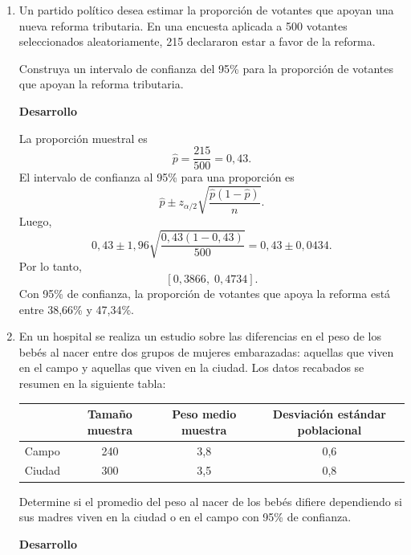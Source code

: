 \documentclass[letterpaper,11pt]{article}
\begin{document}
\begin{enumerate}
Construya un intervalo de confianza del 95\% para el tiempo promedio diario que los usuarios pasan en la aplicación.

\textbf{Desarrollo}

Como la desviación estándar poblacional es conocida, usamos
\[
\bar{x}\pm z_{\alpha/2}\frac{\sigma}{\sqrt{n}}.
\]
Con $\bar{x}=42$, $\sigma=12$, $n=150$ y $z_{0,025}=1,96$:
\[
42\pm 1,96\frac{12}{\sqrt{150}}
=42\pm 1,92.
\]
Así, el intervalo de confianza al 95\% es
\[
\boxed{[40,08,\;43,92].}
\]
Con 95\% de confianza, el tiempo promedio diario se encuentra entre 40,08 y 43,92 minutos.

\item Un partido político desea estimar la proporción de votantes que apoyan una nueva reforma tributaria. En una encuesta aplicada a 500 votantes seleccionados aleatoriamente, 215 declararon estar a favor de la reforma.

Construya un intervalo de confianza del 95\% para la proporción de votantes que apoyan la reforma tributaria.

\textbf{Desarrollo}

La proporción muestral es
\[
\hat{p}=\frac{215}{500}=0,43.
\]
El intervalo de confianza al 95\% para una proporción es
\[
\hat{p}\pm z_{\alpha/2}\sqrt{\frac{\hat{p}(1-\hat{p})}{n}}.
\]
Luego,
\[
0,43\pm 1,96\sqrt{\frac{0,43(1-0,43)}{500}}
=0,43\pm 0,0434.
\]
Por lo tanto,
\[
\boxed{[0,3866,\;0,4734].}
\]
Con 95\% de confianza, la proporción de votantes que apoya la reforma está entre 38,66\% y 47,34\%.

\item En un hospital se realiza un estudio sobre las diferencias en el peso de los bebés al nacer entre dos grupos de mujeres embarazadas: aquellas que viven en el campo y aquellas que viven en la ciudad. Los datos recabados se resumen en la siguiente tabla:
\begin{center}
    \begin{tabular}{| l| c | c| c|}
\hline
& Tamaño muestra& Peso medio muestra & Desviación estándar poblacional \\ \hline
Campo &240 &3,8&0,6 \\
Ciudad & 300& 3,5& 0,8\\ \hline
\end{tabular}
\end{center}
Determine si el promedio del peso al nacer de los bebés difiere dependiendo si sus madres viven en la ciudad o en el campo con 95\% de confianza.

\textbf{Desarrollo}


\end{enumerate}
\end{document}
